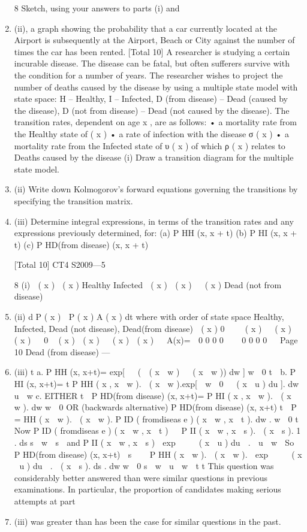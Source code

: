 \documentclass[a4paper,12pt]{article}
\begin{document}
\begin{enumerate}
8
Sketch, using your answers to parts (i) and \item (ii), a graph showing the
probability that a car currently located at the Airport is subsequently at the
Airport, Beach or City against the number of times the car has been rented. 
[Total 10]
A researcher is studying a certain incurable disease. The disease can be fatal, but
often sufferers survive with the condition for a number of years. The researcher
wishes to project the number of deaths caused by the disease by using a multiple state
model with state space:
{ H – Healthy, I – Infected, D (from disease) – Dead (caused by the disease), D (not from disease)
– Dead (not caused by the disease)}.
The transition rates, dependent on age x , are as follows:
• a mortality rate from the Healthy state of \mu ( x )
• a rate of infection with the disease σ ( x )
• a mortality rate from the Infected state of υ ( x ) of which ρ ( x ) relates to Deaths
caused by the disease
(i) Draw a transition diagram for the multiple state model.
\item (ii) Write down Kolmogorov’s forward equations governing the transitions by
specifying the transition matrix.

\item (iii) Determine integral expressions, in terms of the transition rates and any
expressions previously determined, for:
(a) P HH (x, x + t)
(b) P HI (x, x + t)
(c) P HD(from disease) (x, x + t)


[Total 10]
CT4 S2009—5

8
(i)
 ( x )
 ( x )
Healthy Infected
 ( x )  ( x )   ( x )
Dead (not
from
disease)
\item (ii)
d
P ( x )  P ( x ) A ( x )
dt
where with order of state space
{Healthy, Infected, Dead (not disease), Dead(from disease)}
 ( x )
0 
  ( x )   ( x )  ( x )


0
 ( x )  ( x )   ( x )  ( x ) 

A(x)=

0
0
0
0 


0
0
0
0 

Page 10
Dead
(from
disease)  — %
\item (iii)
t
a. P HH (x, x+t)= exp[ 

(  ( x  w )   ( x  w )) dw ]
w  0
t

b. P HI (x, x+t)=
t
P HH ( x , x  w ).  ( x  w ).exp[ 
w  0

 ( x  u ) du ]. dw
u  w
c. EITHER
t

P HD(from disease) (x, x+t)=
P HI ( x , x  w ).  ( x  w ). dw
w  0
OR (backwards alternative)
P HD(from disease) (x, x+t)
t
 P
=
HH
( x  w ).  ( x  w ). P ID ( fromdiseas e ) ( x  w , x  t ). dw .
w  0
t
Now P ID ( fromdiseas e ) ( x  w , x  t ) 
 P
II
( x  w , x  s ).  ( x  s ). 1 . ds
s  w
 s

and P II ( x  w , x  s )  exp     ( x  u ) du  .
 u  w

So P HD(from disease) (x, x+t)
 s

  P HH ( x  w ).  ( x  w ).  exp     ( x  u ) du  .  ( x  s ). ds . dw
w  0
s  w
 u  w

t
t
This question was considerably better answered than were similar questions in
previous examinations. In particular, the proportion of candidates making serious
attempts at part \item (iii) was greater than has been the case for similar questions in the
past.



\end{enumerate}
\end{document}
